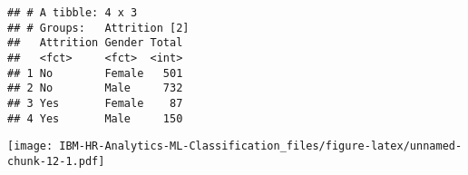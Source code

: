 \documentclass[
]{article}
\newenvironment{Shaded}{\begin{snugshade}}{\end{snugshade}}
\newcommand{\DataTypeTok}[1]{\textcolor[rgb]{0.13,0.29,0.53}{#1}}
\newcommand{\KeywordTok}[1]{\textcolor[rgb]{0.13,0.29,0.53}{\textbf{#1}}}
\newcommand{\NormalTok}[1]{#1}
\newcommand{\OperatorTok}[1]{\textcolor[rgb]{0.81,0.36,0.00}{\textbf{#1}}}
\newcommand{\StringTok}[1]{\textcolor[rgb]{0.31,0.60,0.02}{#1}}
\begin{document}
\begin{verbatim}
## # A tibble: 4 x 3
## # Groups:   Attrition [2]
##   Attrition Gender Total
##   <fct>     <fct>  <int>
## 1 No        Female   501
## 2 No        Male     732
## 3 Yes       Female    87
## 4 Yes       Male     150
\end{verbatim}

\begin{Shaded}
\end{Shaded}

\texttt{[image: IBM-HR-Analytics-ML-Classification\_files/figure-latex/unnamed-chunk-12-1.pdf]}
\end{document}
